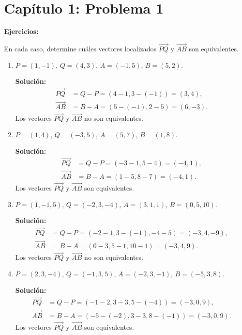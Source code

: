 \section*{Capítulo 1: Problema 1}

\textbf{Ejercicios:}

En cada caso, determine cuáles vectores localizados $\overrightarrow{PQ}$ y $\overrightarrow{AB}$ son equivalentes.

\begin{enumerate}
    \item $P = (1, -1)$, $Q = (4, 3)$, $A = (-1, 5)$, $B = (5, 2)$.
    
    \textbf{Solución:}
    \begin{align*}
        \overrightarrow{PQ} &= Q - P = (4 - 1, 3 - (-1)) = (3, 4), \\
        \overrightarrow{AB} &= B - A = (5 - (-1), 2 - 5) = (6, -3).
    \end{align*}
    Los vectores $\overrightarrow{PQ}$ y $\overrightarrow{AB}$ no son equivalentes.

    \item $P = (1, 4)$, $Q = (-3, 5)$, $A = (5, 7)$, $B = (1, 8)$.
    
    \textbf{Solución:}
    \begin{align*}
        \overrightarrow{PQ} &= Q - P = (-3 - 1, 5 - 4) = (-4, 1), \\
        \overrightarrow{AB} &= B - A = (1 - 5, 8 - 7) = (-4, 1).
    \end{align*}
    Los vectores $\overrightarrow{PQ}$ y $\overrightarrow{AB}$ son equivalentes.

    \item $P = (1, -1, 5)$, $Q = (-2, 3, -4)$, $A = (3, 1, 1)$, $B = (0, 5, 10)$.
    
    \textbf{Solución:}
    \begin{align*}
        \overrightarrow{PQ} &= Q - P = (-2 - 1, 3 - (-1), -4 - 5) = (-3, 4, -9), \\
        \overrightarrow{AB} &= B - A = (0 - 3, 5 - 1, 10 - 1) = (-3, 4, 9).
    \end{align*}
    Los vectores $\overrightarrow{PQ}$ y $\overrightarrow{AB}$ no son equivalentes.

    \item $P = (2, 3, -4)$, $Q = (-1, 3, 5)$, $A = (-2, 3, -1)$, $B = (-5, 3, 8)$.
    
    \textbf{Solución:}
    \begin{align*}
        \overrightarrow{PQ} &= Q - P = (-1 - 2, 3 - 3, 5 - (-4)) = (-3, 0, 9), \\
        \overrightarrow{AB} &= B - A = (-5 - (-2), 3 - 3, 8 - (-1)) = (-3, 0, 9).
    \end{align*}
    Los vectores $\overrightarrow{PQ}$ y $\overrightarrow{AB}$ son equivalentes.
\end{enumerate}

